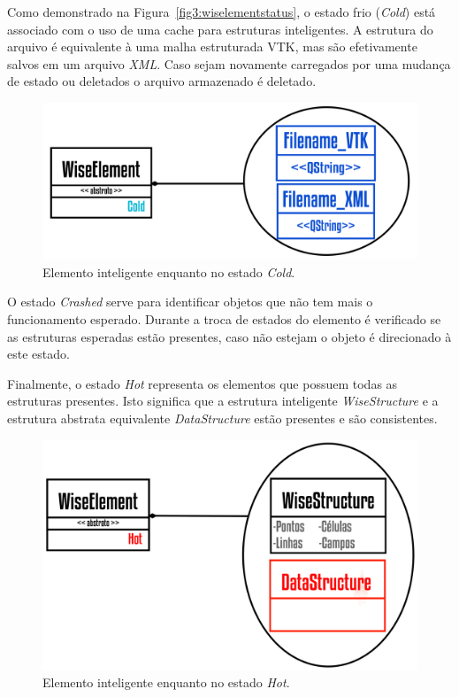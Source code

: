 Como demonstrado na Figura~\ref{fig3:wiselementstatus}, o estado frio (\textit{Cold}) está associado com o uso de uma cache para estruturas inteligentes. A estrutura do arquivo é equivalente à uma malha estruturada VTK, mas são efetivamente salvos em um arquivo \textit{XML}. Caso sejam novamente carregados por uma mudança de estado ou deletados o arquivo armazenado é deletado. 

\begin{figure}[!htbp]
	\centering
	\includegraphics[scale=1.85]{Figures/WiseElementCold@16x.png}
	\caption{Elemento inteligente enquanto no estado \textit{Cold}.}
	\label{fig5:wiselementcold}
\end{figure}

O estado \textit{Crashed} serve para identificar objetos que não tem mais o funcionamento esperado. Durante a troca de estados do elemento é verificado se as estruturas esperadas estão presentes, caso não estejam o objeto é direcionado à este estado.

Finalmente, o estado \textit{Hot} representa os elementos que possuem todas as estruturas presentes. Isto significa que a estrutura inteligente \textit{WiseStructure} e a estrutura abstrata equivalente \textit{DataStructure} estão presentes e são consistentes.

\begin{figure}[!htbp]
	\centering
	\includegraphics[scale=1.85]{Figures/WiseElementHot@16x.png}
	\caption{Elemento inteligente enquanto no estado \textit{Hot}.}
	\label{fig6:wiseelementhot}
\end{figure}

